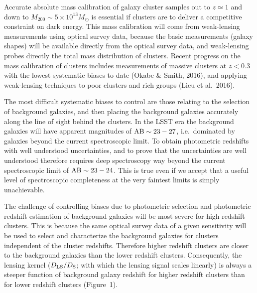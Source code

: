 \documentclass[a4paper,11pt]{article}
\begin{document}
Accurate absolute mass calibration of galaxy cluster samples out to
$z\simeq1$ and down to $M_{200}\sim5\times10^{13}M_\odot$ is essential
if clusters are to deliver a competitive constraint on dark energy.
This mass calibration will come from weak-lensing measurements using
optical survey data, because the basic measurements (galaxy shapes)
will be available directly from the optical survey data, and
weak-lensing probes directly the total mass distribution of clusters.
Recent progress on the mass calibration of clusters includes
measurements of massive clusters at $z<0.3$ with the lowest systematic
biases to date (Okabe \& Smith, 2016), and applying weak-lensing
techniques to poor clusters and rich groups (Lieu et al.\ 2016).

The most difficult systematic biases to control are those relating to
the selection of background galaxies, and then placing the background
galaxies accurately along the line of sight behind the clusters.  In
the LSST era the background galaxies will have apparent magnitudes of
${\rm AB}\sim23-27$, i.e.\ dominated by galaxies beyond the current
spectroscopic limit.  To obtain photometric redshifts with well
understood uncertainties, and to prove that the uncertainties are well
understood therefore requires deep spectroscopy way beyond the current
spectroscopic limit of ${\rm AB}\sim23-24$.  This is true even if we
accept that a useful level of spectroscopic completeness at the very
faintest limits is simply unachievable.

The challenge of controlling biases due to photometric selection and
photometric redshift estimation of background galaxies will be most
severe for high redshift clusters.  This is because the same optical
survey data of a given sensitivity will be used to select and
characterize the background galaxies for clusters independent of the
cluster redshifts.  Therefore higher redshift clusters are closer to
the background galaxies than the lower redshift clusters.
Consequently, the lensing kernel ($D_{\rm LS}/D_{\rm S}$; with which
the lensing signal scales linearly) is always a steeper function of
background galaxy redshift for higher redshift clusters than for lower
redshift clusters (Figure~1).
\end{document}
